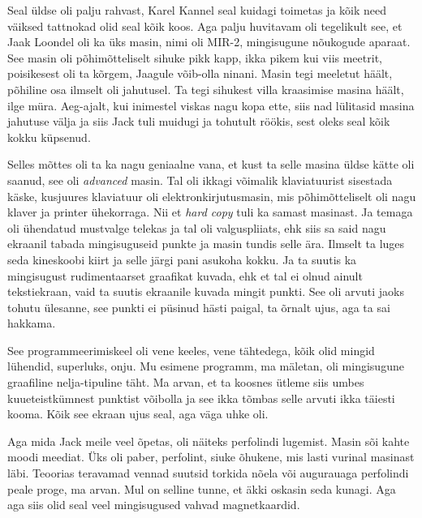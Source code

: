 Seal üldse oli palju rahvast, Karel Kannel seal kuidagi toimetas ja kõik need väiksed tattnokad olid seal kõik koos. Aga palju huvitavam oli tegelikult see, et Jaak Loondel oli ka üks masin, nimi oli MIR-2, mingisugune nõukogude aparaat. See masin oli põhimõtteliselt sihuke pikk kapp, ikka pikem kui viis meetrit, poisikesest oli ta kõrgem, Jaagule võib-olla ninani. Masin tegi meeletut häält, põhiline osa ilmselt oli jahutusel. Ta tegi sihukest villa kraasimise masina häält, ilge müra. Aeg-ajalt, kui inimestel viskas nagu kopa ette, siis nad lülitasid masina jahutuse välja ja siis Jack tuli muidugi ja tohutult röökis, sest oleks seal kõik kokku küpsenud. 

Selles mõttes oli ta ka nagu geniaalne vana, et kust ta selle masina üldse kätte oli saanud, see oli \emph{advanced} masin. Tal oli ikkagi võimalik klaviatuurist sisestada käske, kusjuures klaviatuur oli elektronkirjutusmasin, mis  põhimõtteliselt oli nagu klaver ja printer ühekorraga. Nii et \emph{hard copy} tuli ka samast masinast. Ja temaga oli ühendatud mustvalge telekas ja tal oli valguspliiats,  ehk siis sa said nagu ekraanil tabada mingisuguseid punkte ja  masin tundis selle ära. Ilmselt ta luges seda  kineskoobi kiirt ja selle järgi pani asukoha kokku. Ja ta suutis ka mingisugust rudimentaarset graafikat kuvada, ehk et tal ei olnud ainult tekstiekraan, vaid ta suutis ekraanile kuvada mingit punkti. See oli arvuti jaoks tohutu ülesanne, see punkti ei püsinud hästi paigal, ta õrnalt ujus, aga ta sai hakkama. 

See programmeerimiskeel oli vene keeles, vene tähtedega, kõik olid mingid lühendid, superluks, onju. Mu esimene programm, ma mäletan, oli mingisugune graafiline nelja-tipuline täht. Ma arvan, et ta koosnes ütleme siis  umbes kuueteistkümnest punktist võibolla ja see ikka tõmbas selle arvuti ikka täiesti kooma. Kõik see ekraan ujus seal, aga väga uhke oli. 

Aga mida Jack meile veel õpetas, oli näiteks perfolindi lugemist. Masin sõi kahte moodi meediat. Üks oli paber, perfolint, siuke õhukene, mis lasti vurinal masinast läbi. Teoorias teravamad vennad suutsid torkida nõela või augurauaga  perfolindi peale proge, ma arvan. Mul on selline tunne, et äkki oskasin seda kunagi. Aga aga siis olid seal veel mingisugused vahvad magnetkaardid. 

